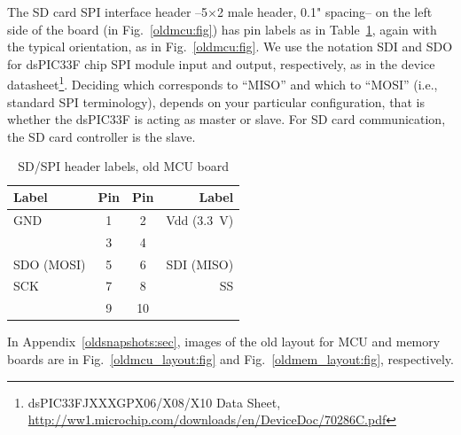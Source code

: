 \documentclass[letterpaper]{article}
\begin{document}
The SD card SPI interface header --5$\times$2 male header, 0.1"
spacing-- on the left side of the board (in Fig.~\ref{oldmcu:fig}) has
pin labels as in Table~\ref{old_sdspi_hdr:tbl}, again with the typical
orientation, as in Fig.~\ref{oldmcu:fig}. We use the notation SDI and
SDO for dsPIC33F chip SPI module input and output, respectively, as in
the device datasheet\footnote{dsPIC33FJXXXGPX06/X08/X10 Data Sheet,
  \url{http://ww1.microchip.com/downloads/en/DeviceDoc/70286C.pdf}}. Deciding
which corresponds to ``MISO'' and which to ``MOSI'' (i.e., standard
SPI terminology), depends on your particular configuration, that is
whether the dsPIC33F is acting as master or slave. For SD card
communication, the SD card controller is the slave.

\begin{table}[h]
\caption{SD/SPI header labels, old MCU board}
\label{old_sdspi_hdr:tbl}
\centering
\begin{tabular}{|l|c|c|r|}
\hline
\textbf{Label}&\textbf{Pin}&\textbf{Pin}&\textbf{Label}\\
\hline
\hline
GND & 1 & 2 & Vdd (3.3~V)\\
\hline
 & 3 & 4 & \\
\hline
SDO (MOSI) & 5 & 6 & SDI (MISO)\\
\hline
SCK & 7 & 8 & SS\\
\hline
 & 9 & 10 & \\
\hline
\end{tabular}
\end{table}

In Appendix~\ref{oldsnapshots:sec}, images of the old layout for MCU
and memory boards are in Fig.~\ref{oldmcu_layout:fig} and
Fig.~\ref{oldmem_layout:fig}, respectively.
\end{document}
